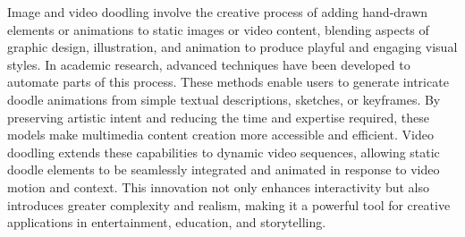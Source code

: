 Image and video doodling involve the creative process of adding hand-drawn elements or animations to static images or video content, blending aspects of graphic design, illustration, and animation to produce playful and engaging visual styles. In academic research, advanced techniques\cite{yu2023designing,videodoodles,belova2021google} have been developed to automate parts of this process. These methods enable users to generate intricate doodle animations from simple textual descriptions, sketches, or keyframes. By preserving artistic intent and reducing the time and expertise required, these models make multimedia content creation more accessible and efficient. Video doodling extends these capabilities to dynamic video sequences, allowing static doodle elements to be seamlessly integrated and animated in response to video motion and context. This innovation not only enhances interactivity but also introduces greater complexity and realism, making it a powerful tool for creative applications in entertainment, education, and storytelling.


